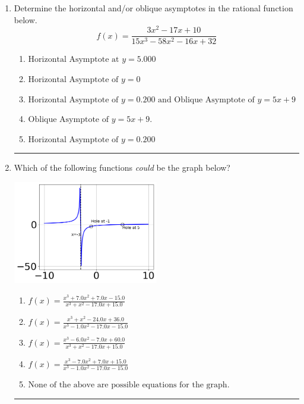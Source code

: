 \documentclass[14pt]{extbook}
\newcommand{\litem}[1]{\item#1\hspace*{-1cm}\rule{\textwidth}{0.4pt}}
\begin{document}
\begin{enumerate}
{\begin{enumerate}[label=\Alph*.]
\end{enumerate} }
\litem{
Determine the horizontal and/or oblique asymptotes in the rational function below.\[ f(x) = \frac{3x^{2} -17 x + 10}{15x^{3} -58 x^{2} -16 x + 32} \]\begin{enumerate}[label=\Alph*.]
\item \( \text{Horizontal Asymptote at } y = 5.000 \)
\item \( \text{Horizontal Asymptote of } y = 0 \)
\item \( \text{Horizontal Asymptote of } y = 0.200 \text{ and Oblique Asymptote of } y = 5x + 9 \)
\item \( \text{Oblique Asymptote of } y = 5x + 9. \)
\item \( \text{Horizontal Asymptote of } y = 0.200  \)

\end{enumerate} }
\litem{
Which of the following functions \textit{could} be the graph below?
\begin{center}
    \includegraphics[width=0.5\textwidth]{../Figures/identifyGraphOfRationalFunctionB.png}
\end{center}
\begin{enumerate}[label=\Alph*.]
\item \( f(x)=\frac{x^{3} +7.0 x^{2} +7.0 x -15.0}{x^{3} + x^{2} -17.0 x + 15.0} \)
\item \( f(x)=\frac{x^{3} + x^{2} -24.0 x + 36.0}{x^{3} -1.0 x^{2} -17.0 x -15.0} \)
\item \( f(x)=\frac{x^{3} -6.0 x^{2} -7.0 x + 60.0}{x^{3} + x^{2} -17.0 x + 15.0} \)
\item \( f(x)=\frac{x^{3} -7.0 x^{2} +7.0 x + 15.0}{x^{3} -1.0 x^{2} -17.0 x -15.0} \)
\item \( \text{None of the above are possible equations for the graph.} \)


\end{enumerate}}
\end{enumerate}
\end{document}

